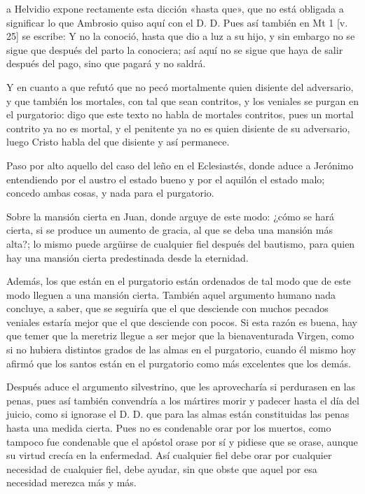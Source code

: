 a Helvidio expone rectamente esta dicción «hasta que», que no está obligada a significar lo que Ambrosio quiso aquí con el D. D. Pues así también en Mt 1 [v. 25] se escribe: Y no la conoció, hasta que dio a luz a su hijo, y sin embargo no se sigue que después del parto la conociera; así aquí no se sigue que haya de salir después del pago, sino que pagará y no saldrá.

Y en cuanto a que refutó que no pecó mortalmente quien disiente del adversario, y que también los mortales, con tal que sean contritos, y los veniales se purgan en el purgatorio: digo que este texto no habla de mortales contritos, pues un mortal contrito ya no es mortal, y el penitente ya no es quien disiente de su adversario, luego Cristo habla del que disiente y así permanece.

Paso por alto aquello del caso del leño en el Eclesiastés, donde aduce a Jerónimo entendiendo por el austro el estado bueno y por el aquilón el estado malo; concedo ambas cosas, y nada para el purgatorio.

Sobre la mansión cierta en Juan, donde arguye de este modo: ¿cómo se hará cierta, si se produce un aumento de gracia, al que se deba una mansión más alta?; lo mismo puede argüirse de cualquier fiel después del bautismo, para quien hay una mansión cierta predestinada desde la eternidad.

Además, los que están en el purgatorio están ordenados de tal modo que de este modo lleguen a una mansión cierta. También aquel argumento humano nada concluye, a saber, que se seguiría que el que desciende con muchos pecados veniales estaría mejor que el que desciende con pocos. Si esta razón es buena, hay que temer que la meretriz llegue a ser mejor que la bienaventurada Virgen, como si no hubiera distintos grados de las almas en el purgatorio, cuando él mismo hoy afirmó que los santos están en el purgatorio como más excelentes que los demás.

Después aduce el argumento silvestrino, que les aprovecharía si perdurasen en las penas, pues así también convendría a los mártires morir y padecer hasta el día del juicio, como si ignorase el D. D. que para las almas están constituidas las penas hasta una medida cierta. Pues no es condenable orar por los muertos, como tampoco fue condenable que el apóstol orase por sí y pidiese que se orase, aunque su virtud crecía en la enfermedad. Así cualquier fiel debe orar por cualquier necesidad de cualquier fiel, debe ayudar, sin que obste que aquel por esa necesidad merezca más y más.

